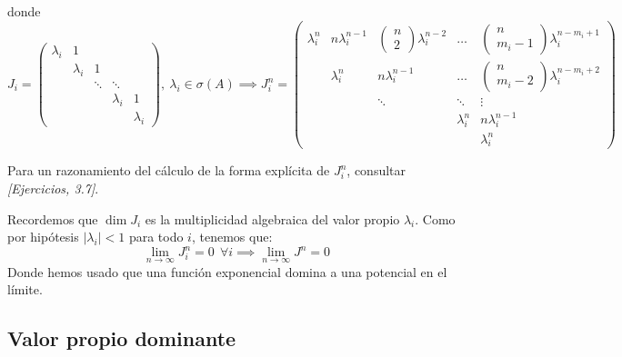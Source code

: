 \documentclass[11pt, a4paper]{article}
\makeatletter
\newif\IfInSansMode
\let\oldsf\sffamily
\renewcommand*{\sffamily}{\oldsf\mathversion{sans}\InSansModetrue}
\let\oldnorm\normalfont
\renewcommand*{\normalfont}{\oldnorm\InSansModefalse\mathversion{normal}}
\renewenvironment{proof}[1][\proofname] {\vspace{-15pt}\par\pushQED{\qed}\normalfont\topsep6\p@\@plus6\p@\relax\trivlist\item[\hskip\labelsep\it#1\@addpunct{.}]\ignorespaces}{\popQED\endtrivlist\@endpefalse}
\numberwithin{equation}{section}
\renewenvironment{proof}[1][\proofname] {\par\pushQED{\qed}\normalfont\topsep6\p@\@plus6\p@\relax\trivlist\item[\hskip\labelsep\itshape\sffamily#1\@addpunct{.}]\ignorespaces}{\popQED\endtrivlist\@endpefalse}
\theoremstyle{theorem-style}
\theoremstyle{definition-style}
\theoremstyle{remark-style}
\theoremstyle{example-style}
\makeatother
\begin{document}
\begin{proof}
    donde $$J_i = \begin{pmatrix}
        \lambda_i & 1 & & & \\
                  & \lambda_i & 1 & \\
                  & & \ddots & \ddots  \\
                  & & & \lambda_i & 1\\
        & & & & \lambda_i
    \end{pmatrix}, \ \lambda_i \in \sigma(A) \implies J_i^n = \begin{pmatrix}
                \lambda_i^n & n\lambda_i^{n-1} & \begin{pmatrix}
                n\\
                2
\end{pmatrix} \lambda_i^{n-2} & \hdots & \begin{pmatrix}
                    n \\
                    m_i-1
                \end{pmatrix} \lambda_i^{n-m_i +1} \\
                 & \lambda_i^n & n\lambda_i^{n-1} & \hdots & \begin{pmatrix}
	        n\\
	        m_i-2
\end{pmatrix} \lambda_i^{n-m_i+2}\\
                                             &  & \ddots & \ddots & \vdots \\
                                            & & & \lambda_i^n & n\lambda_i^{n-1}\\
                                            & & & & \lambda_i^n
            \end{pmatrix}$$
    
    Para un razonamiento del cálculo de la forma explícita de $J_i^n$, consultar \textit{[Ejercicios, 3.7]}.

    Recordemos que $\dim J_i$ es la multiplicidad algebraica del valor propio $\lambda_i$. Como por hipótesis $|\lambda_i| < 1$ para todo $i$, tenemos que: $$\lim_{n \to \infty} J_i^n = 0 \ \  \forall i \implies \lim_{n\to\infty} J^n = 0$$ Donde hemos usado que una función exponencial domina a una potencial en el límite.
\end{proof}

\subsection{Valor propio dominante}
\end{document}
